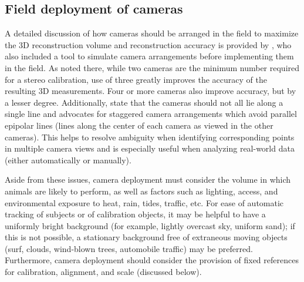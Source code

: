 \documentclass[fleqn,10pt]{wlpeerj}
\begin{document}
\subsection*{Field deployment of cameras}
A detailed discussion of how cameras should be arranged in the field to maximize the 3D reconstruction volume and reconstruction accuracy is provided by \citet{Theriault:2014}, who also included a tool to simulate camera arrangements before implementing them in the field. As noted there, while two cameras are the minimum number required for a stereo calibration, use of three greatly improves the accuracy of the resulting 3D measurements.  Four or more cameras also improve accuracy, but by a lesser degree.  Additionally, \citet{Theriault:2014} state that the cameras should not all lie along a single line and advocates for staggered camera arrangements which avoid parallel epipolar lines (lines along the center of each camera as viewed in the other cameras).  This helps to resolve ambiguity when identifying corresponding points in multiple camera views and is especially useful when analyzing real-world data (either automatically or manually). 

Aside from these issues, camera deployment must consider the volume in which animals are likely to perform, as well as factors such as lighting, access, and environmental exposure to heat, rain, tides, traffic, etc.  For ease of automatic tracking of subjects or of calibration objects, it may be helpful to have a uniformly bright background (for example, lightly overcast sky, uniform sand); if this is not possible, a stationary background free of extraneous moving objects (surf, clouds, wind-blown trees, automobile traffic) may be preferred.  Furthermore, camera deployment should consider the provision of fixed references for calibration, alignment, and scale (discussed below). 
\end{document}
